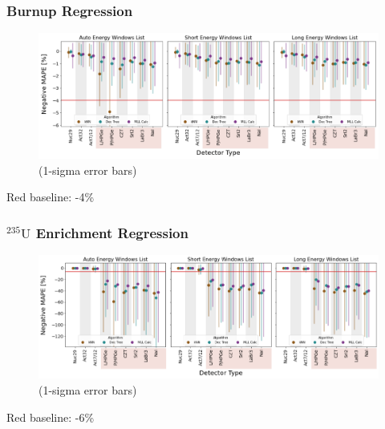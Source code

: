 \begin{frame}
  \frametitle{Burnup Regression}
  \begin{adjustwidth}{-15pt}{-10pt}
  \begin{figure}
    \centering
    \includegraphics[width=1.1\textwidth]{./figures/detector_preds_wrt_enlist_MAPE_burn.png}
    \scriptsize (1-sigma error bars)
  \end{figure}
  \vspace{12pt} \centering Red baseline: -4\% 
  \end{adjustwidth}
\end{frame}

\begin{frame}
  \frametitle{${}^{235}\text{U}$ Enrichment Regression}
  \begin{adjustwidth}{-15pt}{-10pt}
  \begin{figure}
    \centering
    \includegraphics[width=1.1\textwidth]{./figures/detector_preds_wrt_enlist_MAPE_enri.png}
    \scriptsize (1-sigma error bars)
  \end{figure}
  \vspace{12pt} \centering Red baseline: -6\% 
  \end{adjustwidth}
\end{frame}

